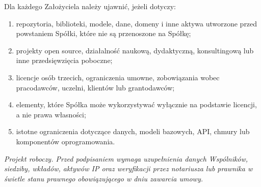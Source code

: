 \documentclass[12pt,a4paper]{article}
\begin{document}
Dla każdego Założyciela należy ujawnić, jeżeli dotyczy:
\begin{enumerate}
  \item repozytoria, biblioteki, modele, dane, domeny i inne aktywa utworzone przed powstaniem Spółki, które nie są przenoszone na Spółkę;
  \item projekty open source, działalność naukową, dydaktyczną, konsultingową lub inne przedsięwzięcia poboczne;
  \item licencje osób trzecich, ograniczenia umowne, zobowiązania wobec pracodawców, uczelni, klientów lub grantodawców;
  \item elementy, które Spółka może wykorzystywać wyłącznie na podstawie licencji, a nie prawa własności;
  \item istotne ograniczenia dotyczące danych, modeli bazowych, API, chmury lub komponentów oprogramowania.
\end{enumerate}

\vfill
\begin{center}
\small
\textit{Projekt roboczy. Przed podpisaniem wymaga uzupełnienia danych Wspólników, siedziby, wkładów, aktywów IP oraz weryfikacji przez notariusza lub prawnika w świetle stanu prawnego obowiązującego w dniu zawarcia umowy.}
\end{center}
\end{document}
